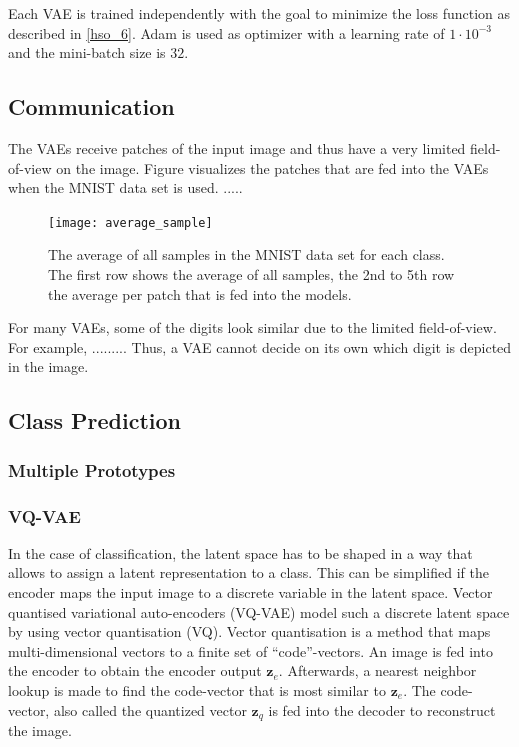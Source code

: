 Each VAE is trained independently with the goal to minimize the loss function as described in \eqref{hso_6}.
Adam  is used as optimizer with a learning rate of $1\cdot 10^{-3}$ and the mini-batch size is $32$.






\subsection{Communication}
The VAEs receive patches of the input image and thus have a very limited field-of-view on the image.
Figure  visualizes the patches that are fed into the VAEs when the MNIST data set \cite{Lecun_Bottou_Bengio_Haffner_1998} is used.
.....


\begin{figure}[h]
    \centering
    \texttt{[image: average\_sample]}
    \caption[Average sample of the MNIST data set per class]{The average of all samples in the MNIST data set for each class. The first row shows the average of all samples, the 2nd to 5th row the average per patch that is fed into the models.}
\end{figure}


For many VAEs, some of the digits look similar due to the limited field-of-view. For example, .........
Thus, a VAE cannot decide on its own which digit is depicted in the image.


\subsection{Class Prediction}

\subsubsection{Multiple Prototypes}


\subsubsection{VQ-VAE}
In the case of classification, the latent space has to be shaped in a way that allows to assign a latent representation to a class.
This can be simplified if the encoder maps the input image to a discrete variable in the latent space.
Vector quantised variational auto-encoders (VQ-VAE)  model such a discrete latent space by using vector quantisation (VQ).
Vector quantisation is a method that maps multi-dimensional vectors to a finite set of ``code''-vectors.
An image is fed into the encoder to obtain the encoder output $\boldsymbol{z}_e$.
Afterwards, a nearest neighbor lookup is made to find the code-vector that is most similar to $\boldsymbol{z}_e$.
The code-vector, also called the quantized vector $\boldsymbol{z}_q$ is fed into the decoder to reconstruct the image.





